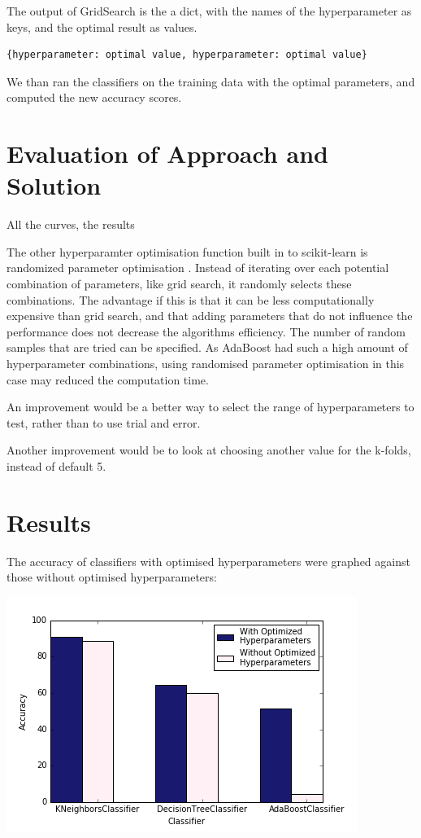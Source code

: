 \documentclass{article}
\begin{document}
		
		The output of GridSearch is the a dict, with the names of the hyperparameter as keys, and the optimal result as values. 
		
		\begin{lstlisting}
{hyperparameter: optimal value, hyperparameter: optimal value}
		\end{lstlisting}

	We than ran the classifiers on the training data with the optimal parameters, and computed the new accuracy scores. 

\newpage

\section{Evaluation of Approach and Solution} 
	All the curves, the results


	The other hyperparamter optimisation function built in to  scikit-learn is randomized parameter optimisation \cite{gridsearch}. Instead of iterating over each potential combination of parameters, like grid search, it randomly selects these combinations. The advantage if this is that it can be less computationally expensive than grid search, and that adding parameters that do not influence the performance does not decrease the algorithms efficiency. The number of random samples that are tried can be specified.  As AdaBoost had such a high amount of hyperparameter combinations, using randomised parameter optimisation in this case may reduced the computation time. 

	An improvement would be a better way to select the range of hyperparameters to test, rather than to use trial and error.

	Another improvement would be to look at choosing another value for the k-folds, instead of default 5. 

\newpage
\section{Results}

The accuracy of classifiers with optimised hyperparameters were graphed against those without optimised hyperparameters:

\includegraphics[scale=0.7]{acc_class}
\end{document}
